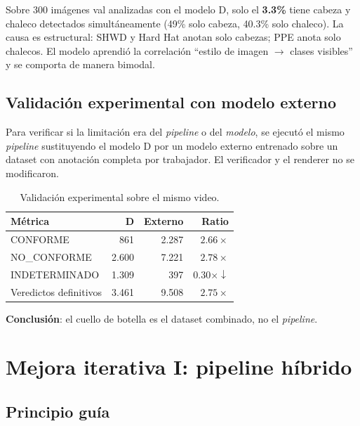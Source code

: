 \documentclass[conference]{IEEEtran}
\begin{document}
Sobre 300 imágenes val analizadas con el modelo D, solo el
\textbf{3.3\%} tiene cabeza y chaleco detectados simultáneamente
(49\% solo cabeza, 40.3\% solo chaleco). La causa es estructural:
SHWD \cite{shwd} y Hard Hat anotan solo cabezas; PPE anota solo
chalecos. El modelo aprendió la correlación ``estilo de imagen
$\to$ clases visibles'' y se comporta de manera bimodal.

\subsection{Validación experimental con modelo externo}

Para verificar si la limitación era del \emph{pipeline} o del
\emph{modelo}, se ejecutó el mismo \emph{pipeline} sustituyendo
el modelo D por un modelo externo entrenado sobre un dataset con
anotación completa por trabajador. El verificador y el renderer
no se modificaron.

\begin{table}[h]
\centering
\caption{Validación experimental sobre el mismo video.}
\label{tab:validacion}
\renewcommand{\arraystretch}{1.15}
\begin{tabular}{l r r r}
\toprule
\textbf{Métrica} & \textbf{D} & \textbf{Externo} & \textbf{Ratio} \\
\midrule
CONFORME & 861 & 2.287 & $2.66\times$ \\
NO\_CONFORME & 2.600 & 7.221 & $2.78\times$ \\
INDETERMINADO & 1.309 & 397 & $0.30\times \downarrow$ \\
Veredictos definitivos & 3.461 & 9.508 & \textbf{$2.75\times$} \\
\bottomrule
\end{tabular}
\end{table}

\textbf{Conclusión}: el cuello de botella es el dataset combinado,
no el \emph{pipeline}.

\section{Mejora iterativa I: pipeline híbrido}

\subsection{Principio guía}
\end{document}
